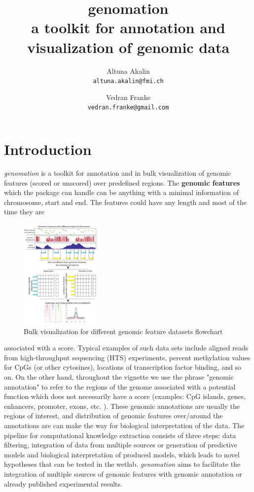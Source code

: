 \documentclass{article}\usepackage[]{graphicx}\usepackage[]{color}
\title{\textbf{genomation} \\ a toolkit for annotation and visualization of genomic data}
\author{Altuna Akalin \\ \texttt{altuna.akalin@fmi.ch}
\and Vedran Franke \\ \texttt{vedran.franke@gmail.com} }
\newcommand{\Rpackage}[1]{{\textit{#1}}}
\begin{document}
\maketitle
\tableofcontents
\vspace{300pt}

\section{Introduction}

\Rpackage{genomation}  is a  toolkit for annotation and in bulk visualization of
genomic features (scored or unscored) over predefined regions.
 The \textbf{genomic features} which the package can handle can 
be anything with a minimal information of chromosome, start and end. 
The features could have any length and most of the time they are 
\begin{figure}
\vspace{-15pt}
  \begin{center}
    \includegraphics[width=0.35\textwidth]{Figures/genomationFlowChart1.pdf}
    \caption{Bulk visualization for different genomic feature datasets flowchart}
  \end{center}
  \vspace{-15pt}
\end{figure}
associated with a score. Typical examples of such data sets include aligned  
reads from high-throughput sequencing (HTS) experiments, percent methylation 
values for CpGs (or other cytosines), locations of transcription factor binding, 
and so on. On the other hand, throughout the vignette we use the phrase 
"genomic annotation" to refer to the regions of the genome associated with a 
potential function which does not necessarily have a score 
(examples: CpG islands, genes, enhancers, promoter, exons, etc. ). 
These genomic annotations are usually the regions of interest, and distribution 
of genomic features over/around the annotations are can make the way for 
biological interpretation of the data.
The pipeline for computational knowledge extraction consists of three steps: 
data filtering, integration of data from multiple sources or generation of 
predictive models and biological interpretation of produced models, which leads 
to novel hypotheses that can be tested in the wetlab. \Rpackage{genomation} aims
to facilitate the integration of multiple sources of genomic features with 
genomic annotation or already published experimental results.
\end{document}
